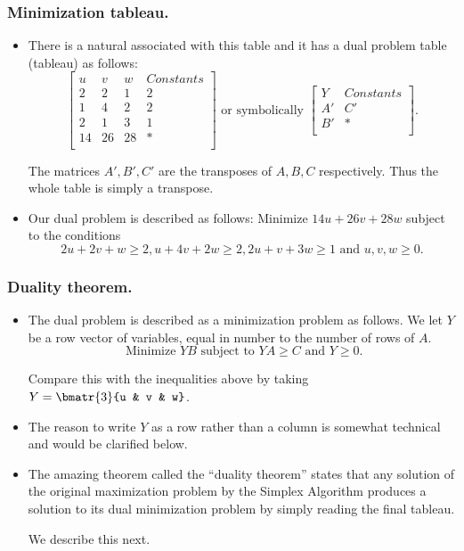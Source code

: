 \begin{frame}%
  \frametitle{Minimization tableau.}
  \begin{itemize}%

\item There is a natural  associated with this table
and it has a dual problem table (tableau) as follows:
$$
\left[
\begin{array}{lll|l}
u & v & w & Constants \\\hline
2 & 2 & 1  & 2\\
1 & 4 & 2 & 2\\
2 & 1 & 3 & 1\\\hline
14 & 26 & 28& *\\
\end{array}
\right]
\mbox{ or symbolically }
\left[
\begin{array}{l|l}
Y & Constants \\\hline
A' & C'\\\hline
B' & *\\
\end{array}
\right].
$$

The matrices $A',B',C'$ are the transposes of $A,B,C$ respectively. Thus
the whole table is simply a transpose.
\item Our dual problem is described as follows:
Minimize $14u+26v+28w$ subject to the conditions
$$2u+2v+w\ge 2, u+4v+2w\ge 2, 2u+v+3w\ge 1 \mbox{ and } u,v,w\ge 0.$$



\end{itemize}
\end{frame}



\begin{frame}%
  \frametitle{Duality theorem.}
  \begin{itemize}%

\item The dual problem is described as a minimization problem as
follows. We let $Y$ be a row vector of variables, equal in number to the
number of rows of $A$.
$$\mbox{ Minimize } YB \mbox{ subject to } YA\ge C \mbox{ and } Y\ge
0.$$

Compare this with the inequalities above by taking $Y=\bmatr{3}{u & v &
w}$.

\item The reason to write $Y$ as a row rather than a column is somewhat technical
and would
be clarified below.

\item The amazing theorem called the ``duality theorem'' states that any
solution of the original maximization problem by the Simplex Algorithm
produces a solution to its dual minimization problem by simply reading
the final tableau.

We describe this next.


\end{itemize}
\end{frame}

